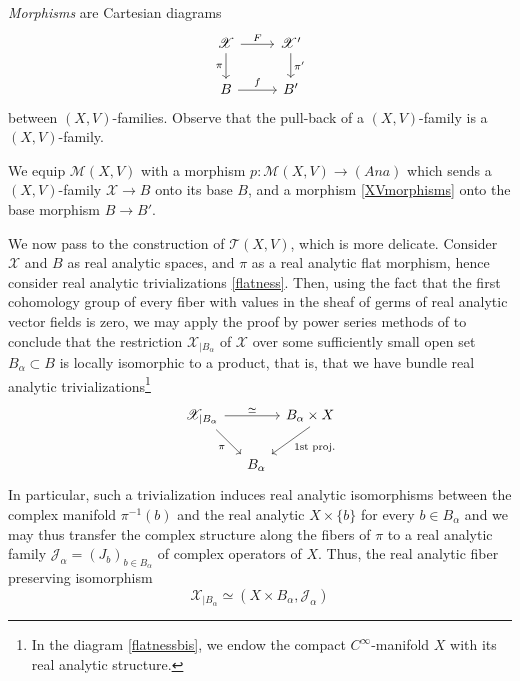 \documentclass[JEP,XML,SOM,Unicode]{cedram}
\let\mathcal\mathscr
\newcommand{\Ana}{\mathit{Ana}}
\theoremstyle{plain}
\theoremstyle{definition}
\theoremstyle{remark}
\numberwithin{equation}{section}
\begin{document}
\emph{Morphisms} are Cartesian diagrams
\begin{equation}
\label{XVmorphisms}
\begin{tikzcd}
\mathcal X\arrow[r,"F"]\arrow[d,swap,"\pi"]&\mathcal X'\arrow[d,"\pi'"]\\
B\arrow[r,"f"]&B'
\end{tikzcd}
\end{equation}
between $(X,V)$-families. Observe that the pull-back of a $(X,V)$-family is a $(X,V)$-family.

We equip $\mathcal M(X,V)$ with a morphism $p:\mathcal M(X,V)\to (\Ana)$ which sends a $(X,V)$-family $\mathcal X\to B$ onto its base $B$, and a morphism \eqref{XVmorphisms} onto the base morphism $B\to B'$.

We now pass to the construction of $\mathcal T(X, V)$, which is more delicate. Consider $\mathcal X$ and $B$ as real analytic spaces, and $\pi$ as a real analytic flat morphism, hence consider real analytic trivializations \eqref{flatness}. Then, using the fact that the first cohomology group of every fiber with values in the sheaf of germs of real analytic vector fields is zero, we may apply the proof by power series methods of \cite[Th.\,3.2]{MK} to conclude that the restriction $\mathcal X_{\vert B_\alpha}$ of $\mathcal X$ over some sufficiently small open set $B_\alpha\subset B$ is locally isomorphic to a product, that is, that we have bundle real analytic trivializations\footnote{In the diagram \eqref{flatnessbis}, we endow the compact $C^\infty$-manifold $X$ with its real analytic structure.}
\begin{equation}
\label{flatnessbis}
\begin{tikzcd}[column sep=tiny, row sep=normal]
\mathcal X_{\vert B_\alpha}\arrow[rrr,"\simeq"] \arrow[rrd, end anchor = north west,"\pi"'] &&&B_\alpha\times X\arrow[dl, start anchor = south, end anchor = north east,"\text{1st proj.}"]\\
&&B_\alpha&
\end{tikzcd}
\end{equation}
In particular, such a trivialization induces real analytic isomorphisms between the complex manifold $\pi^{-1}(b)$ and the real analytic $X\times\{b\}$ for every $b\in B_\alpha$ and we may thus transfer the complex structure along the fibers of $\pi$ to a real analytic family $\mathcal J_\alpha=(J_b)_{b\in B_\alpha}$ of complex operators of $X$. Thus, the real analytic fiber preserving isomorphism
\begin{equation}
\label{trivialization}
\mathcal X_{\vert B_\alpha}\simeq (X\times B_\alpha, \mathcal J_\alpha)
\end{equation}
\end{document}
